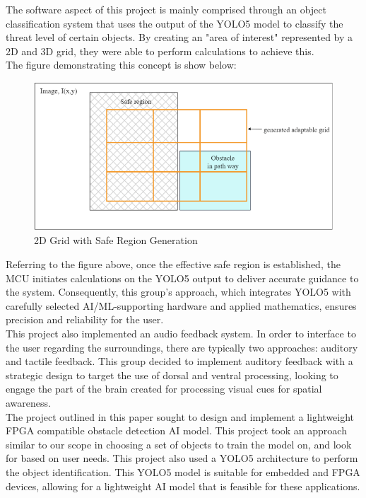 \noindent The software aspect of this project is mainly comprised through an object classification system that uses the output of the YOLO5 model to classify the threat level of certain objects. By creating an "area of interest" represented by a 2D and 3D grid, they were able to perform calculations to achieve this. \\

\noindent The figure demonstrating this concept is show below:
				
\begin{figure}[H]
	\centering
	\includegraphics[width=\textwidth]{./Images/Figure1_Grid_Detection.png}
	\caption{\label{fig:Grid-Generatio}2D Grid with Safe Region Generation}
\end{figure}

\noindent Referring to the figure above, once the effective safe region is established, the MCU initiates calculations on the YOLO5 output to deliver accurate guidance to the system. Consequently, this group's approach, which integrates YOLO5 with carefully selected AI/ML-supporting hardware and applied mathematics, ensures precision and reliability for the user. \\

\noindent This project also implemented an audio feedback system. In order to interface to the user regarding the surroundings, there are typically two approaches: auditory and tactile feedback. This group decided to implement auditory feedback with a strategic design to target the use of dorsal and ventral processing, looking to engage the part of the brain created for processing visual cues for spatial awareness.\\

\noindent The project outlined in this paper \cite{CVRef2} sought to design and implement a lightweight FPGA compatible obstacle detection AI model. This project took an approach similar to our scope in choosing a set of objects to train the model on, and look for based on user needs. This project also used a YOLO5 architecture to perform the object identification. This YOLO5 model is suitable for embedded and FPGA devices, allowing for a lightweight AI model that is feasible for these applications. \\



